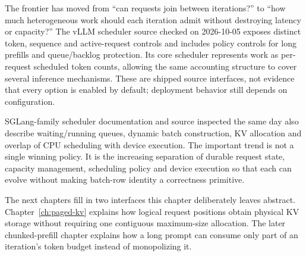 
The frontier has moved from ``can requests join between iterations?'' to
``how much heterogeneous work should each iteration admit without destroying
latency or capacity?'' The vLLM scheduler source checked on 2026-10-05 exposes
distinct token, sequence and active-request controls and includes policy
controls for long prefills and queue/backlog protection. Its core scheduler
represents work as per-request scheduled token counts, allowing the same
accounting structure to cover several inference mechanisms. These are shipped
source interfaces, not evidence that every option is enabled by default;
deployment behavior still depends on configuration.

SGLang-family scheduler documentation and source inspected the same day also
describe waiting/running queues, dynamic batch construction, KV allocation and
overlap of CPU scheduling with device execution. The important trend is not a
single winning policy. It is the increasing separation of durable request
state, capacity management, scheduling policy and device execution so that
each can evolve without making batch-row identity a correctness primitive.

The next chapters fill in two interfaces this chapter deliberately leaves
abstract. Chapter~\ref{ch:paged-kv} explains how logical request positions
obtain physical KV storage without requiring one contiguous maximum-size
allocation. The later chunked-prefill chapter explains how a long prompt can
consume only part of an iteration's token budget instead of monopolizing it.

\ExercisesSection

